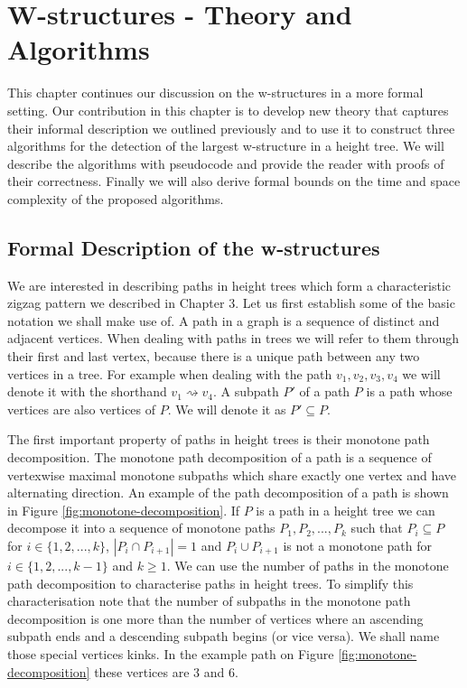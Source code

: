 \chapter{W-structures - Theory and Algorithms}
\label{chapter4}

This chapter continues our discussion on the w-structures in a more formal setting. Our contribution in this chapter is to develop new theory that captures their informal description we outlined previously and to use it to construct three algorithms for the detection of the largest w-structure in a height tree. We will describe the algorithms with pseudocode and provide the reader with proofs of their correctness. Finally we will also derive formal bounds on the time and space complexity of the proposed algorithms.

\section{Formal Description of the w-structures}

We are interested in describing paths in height trees which form a characteristic zigzag pattern we described in Chapter 3. Let us first establish some of the basic notation we shall make use of. A path in a graph is a sequence of distinct and adjacent vertices. When dealing with paths in trees we will refer to them through their first and last vertex, because there is a unique path between any two vertices in a tree. For example when dealing with the path $v_1, v_2, v_3, v_4$ we will denote it with the shorthand $v_1 \rightsquigarrow v_4$. A subpath $P'$ of a path $P$ is a path whose vertices are also vertices of $P$. We will denote it as $P' \subseteq P$.

The first important property of paths in height trees is their monotone path decomposition. The monotone path decomposition of a path is a sequence of vertexwise maximal monotone subpaths which share exactly one vertex and have alternating direction. An example of the path decomposition of a path is shown in Figure \ref{fig:monotone-decomposition}.
If $P$ is a path in a height tree we can decompose it into a sequence of monotone paths $P_1, P_2, ..., P_k$ such that $P_i \subseteq P$ for $i \in \{1, 2, ..., k\}$, $|P_i \cap P_{i+1}| = 1$ and $P_i \cup P_{i+1}$ is not a monotone path for $i \in \{1, 2, ..., k-1\}$ and $k \ge 1$. We can use the number of paths in the monotone path decomposition to characterise paths in height trees. To simplify this characterisation note that the number of subpaths in the monotone path decomposition is one more than the number of vertices where an ascending subpath ends and a descending subpath begins (or vice versa). We shall name those special vertices kinks. In the example path on Figure \ref{fig:monotone-decomposition} these vertices are $3$ and $6$.



